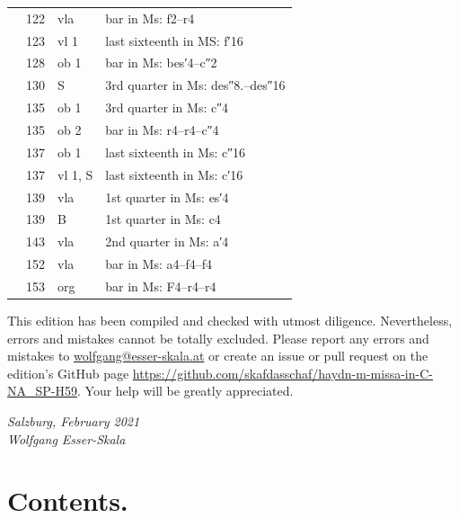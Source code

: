 \documentclass[parskip=full]{scrreprt}
\newif\iftemplate\templatetrue
\begin{document}
\begin{longtable}{lll L{10cm}}
	  & 122 & vla    & bar in Ms: f2–r4 \\
	  & 123 & vl 1   & last sixteenth in MS: f′16 \\
	  & 128 & ob 1   & bar in Ms: bes′4–c″2 \\
	  & 130 & S      & 3rd quarter in Ms: des″8.–des″16 \\
	  & 135 & ob 1   & 3rd quarter in Ms: c″4 \\
	  & 135 & ob 2   & bar in Ms: r4–r4–c″4 \\
	  & 137 & ob 1   & last sixteenth in Ms: c″16 \\
	  & 137 & vl 1, S & last sixteenth in Ms: c′16 \\
	  & 139 & vla    & 1st quarter in Ms: es′4 \\
	  & 139 & B      & 1st quarter in Ms: c4 \\
	  & 143 & vla    & 2nd quarter in Ms: a′4 \\
	  & 152 & vla    & bar in Ms: a4–f4–f4 \\
	  & 153 & org    & bar in Ms: F4–r4–r4 \\
	\bottomrule
\end{longtable}


This edition has been compiled and checked with utmost diligence. Nevertheless, errors and mistakes cannot be totally excluded. Please report any errors and mistakes to \url{wolfgang@esser-skala.at} or create an issue or pull request on the edition’s GitHub page \url{https://github.com/skafdasschaf/haydn-m-missa-in-C-NA_SP-H59}. Your help will be greatly appreciated.

\bigskip
\textit{Salzburg, February 2021\\
Wolfgang Esser-Skala}

\cleardoublepage
\chapter*{Contents.}




\cleardoublepage
\fi

\iftemplate

\fi
\end{document}

